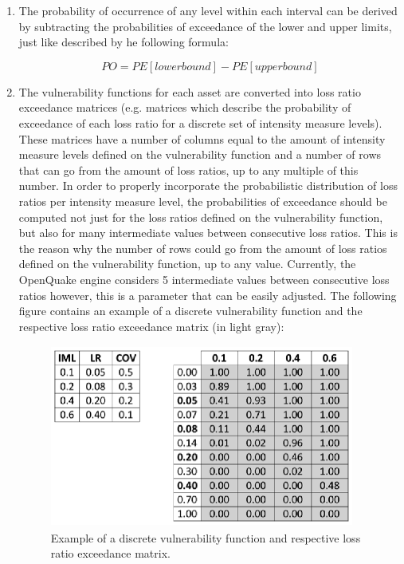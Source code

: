 \begin{enumerate}
\item The probability of occurrence of any level within each interval can be derived by subtracting the probabilities of exceedance of the lower and upper limits, just like described by  he following formula:

\begin{equation}
PO= PE[lower bound]-PE[upper bound]
\end{equation}

\item The vulnerability functions for each asset are converted into loss ratio exceedance matrices (e.g. matrices which describe the probability of exceedance of each loss ratio for a discrete set of intensity measure levels). These matrices have a number of columns equal to the amount of intensity measure levels defined on the vulnerability function and a number of rows that can go from the amount of loss ratios, up to any multiple of this number. In order to properly incorporate the probabilistic distribution of loss ratios per intensity measure level,  the probabilities of exceedance should be computed not just for the loss ratios defined on the vulnerability function, but also for many intermediate values between consecutive loss ratios. This is the reason why the number of rows could go from the amount of loss ratios defined on the vulnerability function, up to any value. Currently, the OpenQuake engine considers 5 intermediate values between consecutive loss ratios however, this is a parameter that can be easily adjusted. The following figure contains an example of a discrete vulnerability function and the respective loss ratio exceedance matrix (in light gray):

\begin{figure}[ht]
\centering
\includegraphics[width=10cm,height=6cm]{./Figures/Part_Risk/LREM.eps}
\caption{Example of a discrete vulnerability function and respective loss ratio exceedance matrix.}
\label{fig: LREM}
\end{figure}


\end{enumerate}
